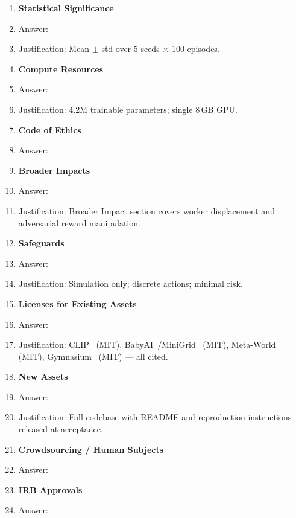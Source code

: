 \documentclass{article}
\begin{document}
\begin{enumerate}
\item {\bf Statistical Significance}
    \item[] Answer: \answerYes{}
    \item[] Justification: Mean $\pm$ std over 5 seeds $\times$ 100 episodes.

\item {\bf Compute Resources}
    \item[] Answer: \answerYes{}
    \item[] Justification: 4.2M trainable parameters; single 8\,GB GPU.

\item {\bf Code of Ethics}
    \item[] Answer: \answerYes{}

\item {\bf Broader Impacts}
    \item[] Answer: \answerYes{}
    \item[] Justification: Broader Impact section covers worker displacement
      and adversarial reward manipulation.

\item {\bf Safeguards}
    \item[] Answer: \answerNA{}
    \item[] Justification: Simulation only; discrete actions; minimal risk.

\item {\bf Licenses for Existing Assets}
    \item[] Answer: \answerYes{}
    \item[] Justification: CLIP~\citep{radford2021clip} (MIT),
      BabyAI~\citep{chevalier2019babyai}/MiniGrid~\citep{minigrid} (MIT),
      Meta-World~\citep{yu2020metaworld} (MIT),
      Gymnasium~\citep{gymnasium} (MIT) — all cited.

\item {\bf New Assets}
    \item[] Answer: \answerYes{}
    \item[] Justification: Full codebase with README and reproduction
      instructions released at acceptance.

\item {\bf Crowdsourcing / Human Subjects}
    \item[] Answer: \answerNA{}

\item {\bf IRB Approvals}
    \item[] Answer: \answerNA{}

\end{enumerate}
\end{document}
